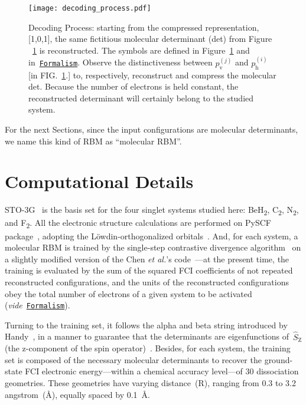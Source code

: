 \documentclass[%
 amsmath,amssymb,
 aps,prl, %
 reprint,%
]{revtex4-1}
\begin{document}
\begin{figure}[t]
    \hypertarget{fig:decoding_process}{}
    \centering
    \texttt{[image: decoding\_process.pdf]} 
    \caption{Decoding Process: starting from the compressed representation, [1,0,1], the same fictitious molecular determinant (det) from Figure ~\protect\hyperlink{fig:encoding_process}{1} is reconstructed. The symbols are defined in Figure~\protect\hyperlink{fig:encoding_process}{1} and in~\protect\hyperlink{sec:formalism}{\texttt{Formalism}}. Observe the distinctiveness between $p_{\text{v}}^{(j)}$ and $p_{\text{h}}^{(i)}$ [in FIG.~\protect\hyperlink{fig:encoding_process}{1}.] to, respectively, reconstruct and compress the molecular det. Because the number of electrons is held constant, the reconstructed determinant will certainly belong to the studied system.~\cite{Figures_Paper}}
\end{figure}
%

\indent For the next Sections, since the input configurations are molecular determinants, we name this kind of RBM as ``molecular RBM''.

\hypertarget{sec:comp_det}{}
\section{Computational Details} 

\indent STO-3G~\cite{Hehre1969,Feller1996,Schuchardt2007} is the basis set for the four singlet systems studied here: BeH\textsubscript{2}, C\textsubscript{2}, N\textsubscript{2}, and
F\textsubscript{2}. All the electronic structure calculations are performed on PySCF package~\cite{Sun2017}, adopting the L\"{o}wdin-orthogonalized orbitals~\cite{Lowdin1950,Mayer2003}. And, for each system, a molecular RBM is trained by the single-step contrastive divergence algorithm~\cite{Hinton2002, Hinton2012, Chen2017} on a slightly modified version of the Chen \emph{et al.}'s code~\cite{Chen2017}---at the present time, the training is evaluated by the sum of the squared FCI coefficients of not repeated reconstructed configurations, and the units of the reconstructed configurations obey the total number of electrons of a given system to be activated (\emph{vide}~\hyperlink{sec:formalism}{\texttt{Formalism}}).   

\indent Turning to the training set, it follows the alpha and beta string introduced by Handy~\cite{Handy1980,Knowles1984,Sherrill1999,Helgaker2000}, in a manner to guarantee that the determinants are eigenfunctions of~$\hat{S}_{\text{Z}}$ (the z-component of the spin operator)~\cite{Szabo1989,Pauncz1979,Helgaker2000,Roos1994,Shankar1994}. Besides, for each system, the training set is composed of the necessary molecular determinants to recover the ground-state FCI electronic energy---within a chemical accuracy level---of 30 dissociation geometries. These geometries have varying distance~(R), ranging from 0.3 to 3.2 angstrom~(\r{A}), equally spaced by 0.1~\r{A}. 
\end{document}
